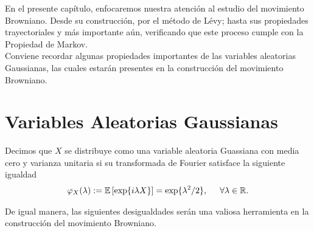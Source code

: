 En el presente capítulo, enfocaremos nuestra atención al estudio del movimiento Browniano. Desde su construcción, por el método de Lévy; hasta sus propiedades trayectoriales y más importante aún, verificando que este proceso cumple con la Propiedad de Markov. \\

Conviene recordar algunas propiedades importantes de las variables aleatorias Gaussianas, las cuales estarán presentes en la construcción del movimiento Browniano. \\

\section{Variables Aleatorias Gaussianas}

Decimos que $X$ se distribuye como una variable aleatoria Guassiana con media cero y varianza unitaria si su transformada de Fourier satisface la siguiente igualdad
	\begin{align*}
	\varphi_X (\lambda) := \mathbb{E}\left[ \exp \{ i \lambda X \} \right] = \exp \{ \lambda^2/2 \}, \hspace{0.5cm} \forall \lambda \in \mathbb{R}.
	\end{align*}
	
De igual manera, las siguientes desigualdades serán una valiosa herramienta en la construcción del movimiento Browniano.

